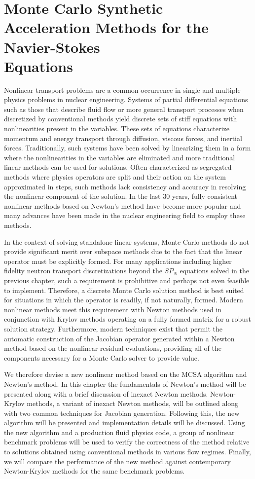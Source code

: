 \chapter{Monte Carlo Synthetic Acceleration Methods for the
  Navier-Stokes \\Equations\ }
\label{ch:nonlinear_problem}
Nonlinear transport problems are a common occurrence in single and
multiple physics problems in nuclear engineering. Systems of partial
differential equations such as those that describe fluid flow or more
general transport processes when discretized by conventional methods
yield discrete sets of stiff equations with nonlinearities present in
the variables. These sets of equations characterize momentum and
energy transport through diffusion, viscous forces, and inertial
forces. Traditionally, such systems have been solved by
linearizing them in a form where the nonlinearities in the variables
are eliminated and more traditional linear methods can be used for
solutions. Often characterized as segregated methods where physics
operators are split and their action on the system approximated in
steps, such methods lack consistency and accuracy in resolving the
nonlinear component of the solution. In the last 30 years, fully
consistent nonlinear methods based on Newton's method have become more
popular and many advances have been made in the nuclear engineering
field to employ these methods.

In the context of solving standalone linear systems, Monte Carlo
methods do not provide significant merit over subspace methods due to
the fact that the linear operator must be explicitly formed. For many
applications including higher fidelity neutron transport
discretizations beyond the $SP_N$ equations solved in the previous
chapter, such a requirement is prohibitive and perhaps not even
feasible to implement. Therefore, a discrete Monte Carlo solution
method is best suited for situations in which the operator is readily,
if not naturally, formed. Modern nonlinear methods meet this
requirement with Newton methods used in conjunction with Krylov
methods operating on a fully formed matrix for a robust solution
strategy. Furthermore, modern techniques exist that permit the
automatic construction of the Jacobian operator generated within a
Newton method based on the nonlinear residual evaluations, providing
all of the components necessary for a Monte Carlo solver to provide
value.

We therefore devise a new nonlinear method based on the MCSA algorithm
and Newton's method. In this chapter the fundamentals of Newton's
method will be presented along with a brief discussion of inexact
Newton methods. Newton-Krylov methods, a variant of inexact Newton
methods, will be outlined along with two common techniques for
Jacobian generation. Following this, the new algorithm will be
presented and implementation details will be discussed. Using the new
algorithm and a production fluid physics code, a group of nonlinear
benchmark problems will be used to verify the correctness of the
method relative to solutions obtained using conventional methods in
various flow regimes. Finally, we will compare the performance of the
new method against contemporary Newton-Krylov methods for the same
benchmark problems.

